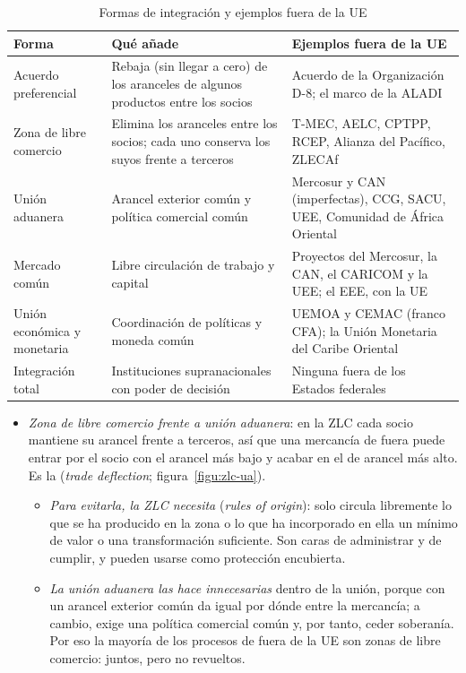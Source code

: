 \documentclass[11pt]{article}
\begin{document}
\begin{table}[H]
\centering
\caption{Formas de integración y ejemplos fuera de la UE}\label{tab:formas}
\footnotesize
\renewcommand{\arraystretch}{1.25}
\begin{tabular}{>{\raggedright\arraybackslash}m{2.6cm}>{\raggedright\arraybackslash}m{5.6cm}>{\raggedright\arraybackslash}m{6.3cm}}
\toprule
\rowcolor{tceeazulpalido}\textbf{Forma} & \textbf{Qué añade} & \textbf{Ejemplos fuera de la UE}\\
\midrule
Acuerdo preferencial & Rebaja (sin llegar a cero) de los aranceles de algunos productos entre los socios & Acuerdo de la Organización D-8; el marco de la ALADI\\
Zona de libre comercio & Elimina los aranceles entre los socios; cada uno conserva los suyos frente a terceros & T-MEC, AELC, CPTPP, RCEP, Alianza del Pacífico, ZLECAf\\
Unión aduanera & Arancel exterior común y política comercial común & Mercosur y CAN (imperfectas), CCG, SACU, UEE, Comunidad de África Oriental\\
Mercado común & Libre circulación de trabajo y capital & Proyectos del Mercosur, la CAN, el CARICOM y la UEE; el EEE, con la UE\\
Unión económica y monetaria & Coordinación de políticas y moneda común & UEMOA y CEMAC (franco CFA); la Unión Monetaria del Caribe Oriental\\
Integración total & Instituciones supranacionales con poder de decisión & Ninguna fuera de los Estados federales\\
\bottomrule
\end{tabular}

\smallskip
{}
\end{table}

\begin{itemize}
\item \emph{Zona de libre comercio frente a unión aduanera}: en la ZLC cada socio mantiene su arancel frente a terceros, así que una mercancía de fuera puede entrar por el socio con el arancel más bajo y acabar en el de arancel más alto. Es la  (\emph{trade deflection}; figura~\ref{figu:zlc-ua}).
  \begin{itemize}
  \item \emph{Para evitarla, la ZLC necesita}  (\emph{rules of origin}): solo circula libremente lo que se ha producido en la zona o lo que ha incorporado en ella un mínimo de valor o una transformación suficiente. Son caras de administrar y de cumplir, y pueden usarse como protección encubierta.
  \item \emph{La unión aduanera las hace innecesarias} dentro de la unión, porque con un arancel exterior común da igual por dónde entre la mercancía; a cambio, exige una política comercial común y, por tanto, ceder soberanía. Por eso la mayoría de los procesos de fuera de la UE son zonas de libre comercio: juntos, pero no revueltos.
  \end{itemize}
\end{itemize}
\end{document}

